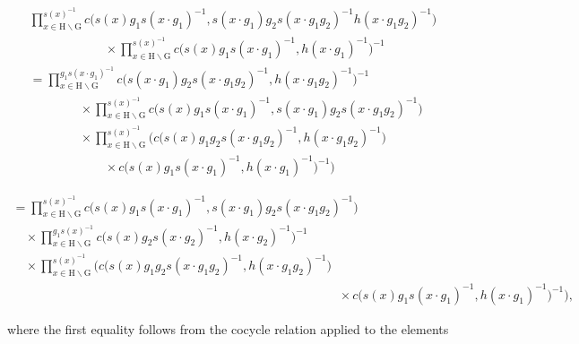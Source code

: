 \[
\begin{array}{l} \prod_ {x \in \mathrm{H} \backslash \mathrm{G}} ^ {s (x) ^ {- 1}} c \big (s (x) g _ {1} s (x \cdot g _ {1}) ^ {- 1}, s (x \cdot g _ {1}) g _ {2} s (x \cdot g _ {1} g _ {2}) ^ {- 1} h (x \cdot g _ {1} g _ {2}) ^ {- 1} \big) \\ \qquad \qquad \qquad \times \prod_ {x \in \mathrm{H} \backslash \mathrm{G}} ^ {s (x) ^ {- 1}} c \big (s (x) g _ {1} s (x \cdot g _ {1}) ^ {- 1}, h (x \cdot g _ {1}) ^ {- 1} \big) ^ {- 1} \\ = \prod_ {x \in \mathrm{H} \backslash \mathrm{G}} ^ {g _ {1} s (x \cdot g _ {1}) ^ {- 1}} c \big (s (x \cdot g _ {1}) g _ {2} s (x \cdot g _ {1} g _ {2}) ^ {- 1}, h (x \cdot g _ {1} g _ {2}) ^ {- 1} \big) ^ {- 1} \\ \qquad \qquad \times \prod_ {x \in \mathrm{H} \backslash \mathrm{G}} ^ {s (x) ^ {- 1}} c \big (s (x) g _ {1} s (x \cdot g _ {1}) ^ {- 1}, s (x \cdot g _ {1}) g _ {2} s (x \cdot g _ {1} g _ {2}) ^ {- 1} \big) \\ \qquad \qquad \times \prod_ {x \in \mathrm{H} \backslash \mathrm{G}} ^ {s (x) ^ {- 1}} \Big (c \big (s (x) g _ {1} g _ {2} s (x \cdot g _ {1} g _ {2}) ^ {- 1}, h (x \cdot g _ {1} g _ {2}) ^ {- 1} \big) \\ \qquad \qquad \qquad \times c \big (s (x) g _ {1} s (x \cdot g _ {1}) ^ {- 1}, h (x \cdot g _ {1}) ^ {- 1} \big) ^ {- 1} \Big) \end{array}
\]

\[
\begin{array}{l} = \prod_ {x \in \mathrm{H} \backslash \mathrm{G}} ^ {s (x) ^ {- 1}} c \big (s (x) g _ {1} s (x \cdot g _ {1}) ^ {- 1}, s (x \cdot g _ {1}) g _ {2} s (x \cdot g _ {1} g _ {2}) ^ {- 1} \big) \\ \quad \times \prod_ {x \in \mathrm{H} \backslash \mathrm{G}} ^ {g _ {1} s (x) ^ {- 1}} c \big (s (x) g _ {2} s (x \cdot g _ {2}) ^ {- 1}, h (x \cdot g _ {2}) ^ {- 1} \big) ^ {- 1} \\ \quad \times \prod_ {x \in \mathrm{H} \backslash \mathrm{G}} ^ {s (x) ^ {- 1}} \Big (c \big (s (x) g _ {1} g _ {2} s (x \cdot g _ {1} g _ {2}) ^ {- 1}, h (x \cdot g _ {1} g _ {2}) ^ {- 1} \big) \\ \qquad \qquad \qquad \qquad \qquad \qquad \qquad \qquad \qquad \qquad \qquad \qquad \qquad \times c \big (s (x) g _ {1} s (x \cdot g _ {1}) ^ {- 1}, h (x \cdot g _ {1}) ^ {- 1} \big) ^ {- 1} \Big), \end{array}
\]

where the first equality follows from the cocycle relation applied to the elements

